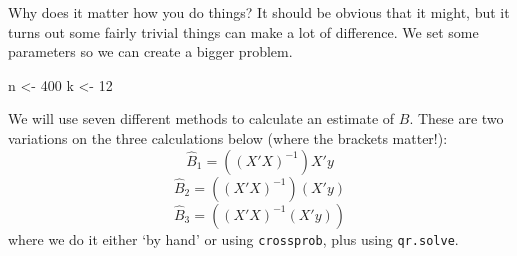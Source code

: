 \documentclass[
  letterpaper,
]{book}
\newenvironment{Shaded}{\begin{snugshade}}{\end{snugshade}}
\newcommand{\DecValTok}[1]{\textcolor[rgb]{0.68,0.00,0.00}{#1}}
\newcommand{\NormalTok}[1]{\textcolor[rgb]{0.00,0.23,0.31}{#1}}
\newcommand{\OtherTok}[1]{\textcolor[rgb]{0.00,0.23,0.31}{#1}}
\begin{document}
Why does it matter how you do things? It should be obvious that it
might, but it turns out some fairly trivial things can make a lot of
difference. We set some parameters so we can create a bigger problem.

\begin{Shaded}
\begin{Highlighting}[]
\NormalTok{n }\OtherTok{\textless{}{-}} \DecValTok{400}
\NormalTok{k }\OtherTok{\textless{}{-}} \DecValTok{12}
\end{Highlighting}
\end{Shaded}

We will use seven different methods to calculate an estimate of \(B\).
These are two variations on the three calculations below (where the
brackets matter!): \[
\hat B_1 = ((X'X)^{-1}) X' y 
\] \[
\hat B_2 = ((X'X)^{-1}) (X' y) 
\] \[
\hat B_3 = ((X'X)^{-1} (X' y))
\] where we do it either `by hand' or using \texttt{crossprob}, plus
using \texttt{qr.solve}.
\end{document}
